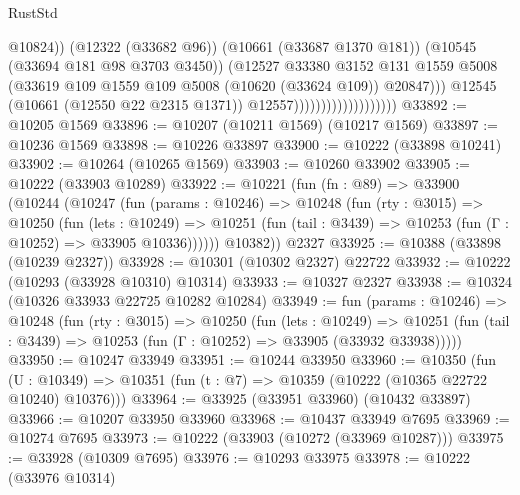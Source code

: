 \begin{lexlean}{RustStd}
\begin{coremodule}
                                                @10824))
                                            (@12322 (@33682 @96))
                                            (@10661 (@33687 @1370 @181))
                                            (@10545 (@33694 @181 @98 @3703 @3450))
                                            (@12527
                                              @33380
                                              @3152
                                              @131
                                              @1559
                                              @5008
                                              (@33619
                                                @109
                                                @1559
                                                @109
                                                @5008
                                                (@10620 (@33624 @109))
                                                @20847)))
                                          @12545
                                          (@10661 (@12550 @22 @2315 @1371))
                                          @12557)))))))))))))))))))
@33892 := @10205 @1569
@33896 := @10207 (@10211 @1569) (@10217 @1569)
@33897 := @10236 @1569
@33898 := @10226 @33897
@33900 := @10222 (@33898 @10241)
@33902 := @10264 (@10265 @1569)
@33903 := @10260 @33902
@33905 := @10222 (@33903 @10289)
@33922 := @10221
    (fun (fn : @89) =>
    @33900
      (@10244
        (@10247
          (fun (params : @10246) =>
          @10248
            (fun (rty : @3015) =>
            @10250
              (fun (lets : @10249) =>
              @10251 (fun (tail : @3439) => @10253 (fun (Γ : @10252) => @33905 @10336))))))
        @10382))
    @2327
@33925 := @10388 (@33898 (@10239 @2327))
@33928 := @10301 (@10302 @2327) @22722
@33932 := @10222 (@10293 (@33928 @10310) @10314)
@33933 := @10327 @2327
@33938 := @10324 (@10326 @33933 @22725 @10282 @10284)
@33949 := fun (params : @10246) =>
  @10248
    (fun (rty : @3015) =>
    @10250
      (fun (lets : @10249) =>
      @10251 (fun (tail : @3439) => @10253 (fun (Γ : @10252) => @33905 (@33932 @33938)))))
@33950 := @10247 @33949
@33951 := @10244 @33950
@33960 := @10350
    (fun (U : @10349) => @10351 (fun (t : @7) => @10359 (@10222 (@10365 @22722 @10240) @10376)))
@33964 := @33925 (@33951 @33960) (@10432 @33897)
@33966 := @10207 @33950 @33960
@33968 := @10437 @33949 @7695
@33969 := @10274 @7695
@33973 := @10222 (@33903 (@10272 (@33969 @10287)))
@33975 := @33928 (@10309 @7695)
@33976 := @10293 @33975
@33978 := @10222 (@33976 @10314)

\end{coremodule}
\end{lexlean}
